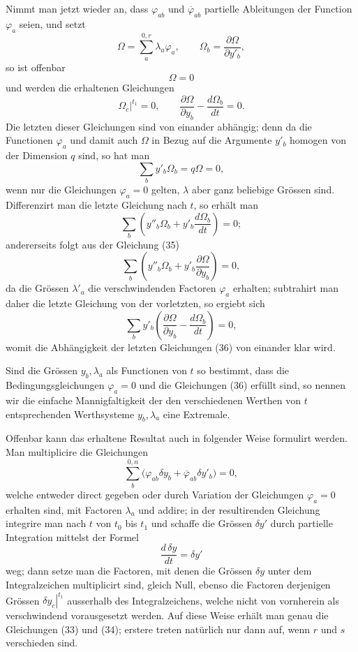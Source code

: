 \documentclass[11pt,a4paper,leqno]{article}
\begin{document}
Nimmt man jetzt wieder an, dass $\varphi_{ab}$ und $\overline{\varphi}_{ab}$ partielle Ableitungen der Function $\varphi_a$ seien, und setzt
\[
\Omega=\sum_a^{0,r}\lambda_a\varphi_a,
\qquad
\Omega_b=\frac{\partial\Omega}{\partial y'_b},
\]
so ist offenbar
\begin{equation}\tag{35}
\Omega=0
\end{equation}
und werden die erhaltenen Gleichungen
\begin{equation}\tag{36}
\left.\Omega_c\right|^{t_1}=0,
\qquad
\frac{\partial\Omega}{\partial y_b}-\frac{d\Omega_b}{dt}=0.
\end{equation}
Die letzten dieser Gleichungen sind von einander abhängig; denn da die Functionen $\varphi_a$ und damit auch $\Omega$ in Bezug auf die Argumente $y'_b$ homogen von der Dimension $q$ sind, so hat man
\begin{equation}\tag{37}
\sum_b y'_b\Omega_b=q\Omega=0,
\end{equation}
wenn nur die Gleichungen $\varphi_a=0$ gelten, $\lambda$ aber ganz beliebige Grössen sind. Differenzirt man die letzte Gleichung nach $t$, so erhält man
\[
\sum_b\left(y''_b\Omega_b+y'_b\frac{d\Omega_b}{dt}\right)=0;
\]
andererseits folgt aus der Gleichung (35)
\[
\sum_b\left(y''_b\Omega_b+y'_b\frac{\partial\Omega}{\partial y_b}\right)=0,
\]
da die Grössen $\lambda'_a$ die verschwindenden Factoren $\varphi_a$ erhalten; subtrahirt man daher die letzte Gleichung von der vorletzten, so ergiebt sich
\begin{equation}\tag{38}
\sum_b y'_b
\left(
\frac{\partial\Omega}{\partial y_b}-\frac{d\Omega_b}{dt}
\right)=0,
\end{equation}
womit die Abhängigkeit der letzten Gleichungen (36) von einander klar wird.

Sind die Grössen $y_b,\lambda_a$ als Functionen von $t$ so bestimmt, dass die Bedingungsgleichungen $\varphi_a=0$ und die Gleichungen (36) erfüllt sind, so nennen wir die einfache Mannigfaltigkeit der den verschiedenen Werthen von $t$ entsprechenden Werthsysteme $y_b,\lambda_a$ eine Extremale.

Offenbar kann das erhaltene Resultat auch in folgender Weise formulirt werden. Man multiplicire die Gleichungen
\[
\sum_b^{0,n}\bigl(\varphi_{ab}\delta y_b+\overline{\varphi}_{ab}\delta y'_b\bigr)=0,
\]
welche entweder direct gegeben oder durch Variation der Gleichungen $\varphi_a=0$ erhalten sind, mit Factoren $\lambda_a$ und addire; in der resultirenden Gleichung integrire man nach $t$ von $t_0$ bis $t_1$ und schaffe die Grössen $\delta y'$ durch partielle Integration mittelst der Formel
\[
\frac{d\,\delta y}{dt}=\delta y'
\]
weg; dann setze man die Factoren, mit denen die Grössen $\delta y$ unter dem Integralzeichen multiplicirt sind, gleich Null, ebenso die Factoren derjenigen Grössen $\left.\delta y_c\right|^{t_1}$ ausserhalb des Integralzeichens, welche nicht von vornherein als verschwindend vorausgesetzt werden. Auf diese Weise erhält man genau die Gleichungen (33) und (34); erstere treten natürlich nur dann auf, wenn $r$ und $s$ verschieden sind.
\end{document}
